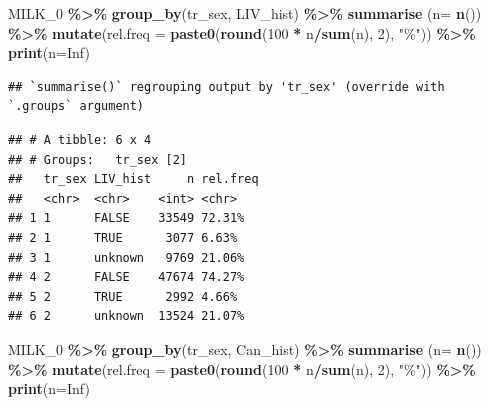 \documentclass[
]{article}
\newenvironment{Shaded}{\begin{snugshade}}{\end{snugshade}}
\newcommand{\DataTypeTok}[1]{\textcolor[rgb]{0.13,0.29,0.53}{#1}}
\newcommand{\DecValTok}[1]{\textcolor[rgb]{0.00,0.00,0.81}{#1}}
\newcommand{\KeywordTok}[1]{\textcolor[rgb]{0.13,0.29,0.53}{\textbf{#1}}}
\newcommand{\NormalTok}[1]{#1}
\newcommand{\OperatorTok}[1]{\textcolor[rgb]{0.81,0.36,0.00}{\textbf{#1}}}
\newcommand{\OtherTok}[1]{\textcolor[rgb]{0.56,0.35,0.01}{#1}}
\newcommand{\StringTok}[1]{\textcolor[rgb]{0.31,0.60,0.02}{#1}}
\begin{document}
\begin{Shaded}
\begin{Highlighting}[]
\NormalTok{MILK\_}\DecValTok{0} \OperatorTok{\%\textgreater{}\%}\StringTok{ }
\StringTok{  }\KeywordTok{group\_by}\NormalTok{(tr\_sex, LIV\_hist) }\OperatorTok{\%\textgreater{}\%}\StringTok{ }
\StringTok{  }\KeywordTok{summarise}\NormalTok{ (}\DataTypeTok{n=} \KeywordTok{n}\NormalTok{()) }\OperatorTok{\%\textgreater{}\%}
\StringTok{  }\KeywordTok{mutate}\NormalTok{(}\DataTypeTok{rel.freq =} \KeywordTok{paste0}\NormalTok{(}\KeywordTok{round}\NormalTok{(}\DecValTok{100} \OperatorTok{*}\StringTok{ }\NormalTok{n}\OperatorTok{/}\KeywordTok{sum}\NormalTok{(n), }\DecValTok{2}\NormalTok{), }\StringTok{"\%"}\NormalTok{))  }\OperatorTok{\%\textgreater{}\%}\StringTok{ }
\StringTok{  }\KeywordTok{print}\NormalTok{(}\DataTypeTok{n=}\OtherTok{Inf}\NormalTok{)}
\end{Highlighting}
\end{Shaded}

\begin{verbatim}
## `summarise()` regrouping output by 'tr_sex' (override with `.groups` argument)
\end{verbatim}

\begin{verbatim}
## # A tibble: 6 x 4
## # Groups:   tr_sex [2]
##   tr_sex LIV_hist     n rel.freq
##   <chr>  <chr>    <int> <chr>   
## 1 1      FALSE    33549 72.31%  
## 2 1      TRUE      3077 6.63%   
## 3 1      unknown   9769 21.06%  
## 4 2      FALSE    47674 74.27%  
## 5 2      TRUE      2992 4.66%   
## 6 2      unknown  13524 21.07%
\end{verbatim}

\begin{Shaded}
\begin{Highlighting}[]
\NormalTok{MILK\_}\DecValTok{0} \OperatorTok{\%\textgreater{}\%}\StringTok{ }
\StringTok{  }\KeywordTok{group\_by}\NormalTok{(tr\_sex, Can\_hist) }\OperatorTok{\%\textgreater{}\%}\StringTok{ }
\StringTok{  }\KeywordTok{summarise}\NormalTok{ (}\DataTypeTok{n=} \KeywordTok{n}\NormalTok{()) }\OperatorTok{\%\textgreater{}\%}
\StringTok{  }\KeywordTok{mutate}\NormalTok{(}\DataTypeTok{rel.freq =} \KeywordTok{paste0}\NormalTok{(}\KeywordTok{round}\NormalTok{(}\DecValTok{100} \OperatorTok{*}\StringTok{ }\NormalTok{n}\OperatorTok{/}\KeywordTok{sum}\NormalTok{(n), }\DecValTok{2}\NormalTok{), }\StringTok{"\%"}\NormalTok{))  }\OperatorTok{\%\textgreater{}\%}\StringTok{ }
\StringTok{  }\KeywordTok{print}\NormalTok{(}\DataTypeTok{n=}\OtherTok{Inf}\NormalTok{)}
\end{Highlighting}
\end{Shaded}
\end{document}
